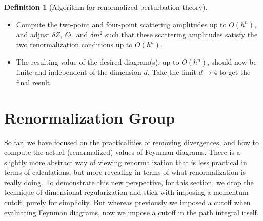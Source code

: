 \documentclass{report}
\theoremstyle{plain}
\theoremstyle{definition}
\newtheorem{definition}[theorem]{Definition}
\theoremstyle{remark}
\begin{document}
\begin{definition}[Algorithm for renormalized perturbation theory]
\begin{itemize}
\begin{align*}
      \begin{tikzpicture}[node distance=0.4cm and 0.4cm,baseline={([yshift=-.5ex]current bounding box.center)}]
        \coordinate (J1);
        \coordinate[counterterm,below right=of J1] (w);
        \coordinate[below left=of w] (J2);
        \coordinate[above right=of w] (J3);
        \coordinate[below right=of w] (J4);
        \begin{scope}[every node/.style={scale=.85}]
          \draw[fermion] (J1) -- (w);
          \draw[fermion] (J2) -- (w);
          \draw[fermion] (J3) -- (w);
          \draw[fermion] (J4) -- (w);
        \end{scope}
      \end{tikzpicture} &= -i\delta\lambda.
    \end{align*}
    to compute the value of the desired diagram(s), up to
    $O(\hbar^n)$. Write down the resulting value as a function of $d$,
    the dimensionality.
  \item Compute the two-point and four-point scattering amplitudes up
    to $O(\hbar^n)$, and adjust $\delta Z$, $\delta \lambda$, and
    $\delta m^2$ such that these scattering amplitudes satisfy the two
    renormalization conditions up to $O(\hbar^n)$.
  \item The resulting value of the desired diagram(s), up to
    $O(\hbar^n)$, should now be finite and independent of the
    dimension $d$. Take the limit $d \to 4$ to get the final result.
  \end{itemize}
\end{definition}

\section{Renormalization Group}

So far, we have focused on the practicalities of removing divergences,
and how to compute the actual (renormalized) values of Feynman
diagrams. There is a slightly more abstract way of viewing
renormalization that is less practical in terms of calculations, but
more revealing in terms of what renormalization is really doing. To
demonstrate this new perspective, for this section, we drop the
technique of dimensional regularization and stick with imposing a
momentum cutoff, purely for simplicity. But whereas previously we
imposed a cutoff when evaluating Feynman diagrams, now we impose a
cutoff in the path integral itself.
\end{document}

